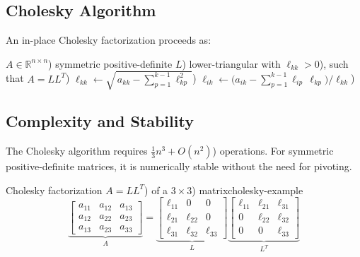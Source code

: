 \subsection{Cholesky Algorithm}
An in-place Cholesky factorization proceeds as:
\begin{algorithm}[H]
    \caption{Cholesky Decomposition}
    \label{alg:cholesky}
    \begin{algorithmic}[1]
        \Require \(A\in\mathbb{R}^{n\times n}\)) symmetric positive-definite
        \Ensure \(L\)) lower-triangular with \(\ell_{kk}>0\)), such that \(A = LL^T\))
        \State \(\ell_{kk} \gets \sqrt{\,a_{kk} - \sum_{p=1}^{k-1} \ell_{kp}^2\,}\))
        \State \(\ell_{ik} \gets \bigl(a_{ik} - \sum_{p=1}^{k-1} \ell_{ip}\,\ell_{kp}\bigr) / \ell_{kk}\))
        \EndFor
        \EndFor
    \end{algorithmic}
\end{algorithm}

\subsection{Complexity and Stability}
The Cholesky algorithm requires \(\tfrac{1}{3}n^3 + O(n^2)\)) operations. For symmetric positive-definite matrices, it is numerically stable without the need for pivoting.

\begin{example}{Cholesky factorization \(A=LL^T\)) of a \(3\times3\)) matrix}{cholesky-example}
    \begin{equation*}
        \underbrace{
            \begin{bmatrix}
                a_{11} & a_{12} & a_{13} \\
                a_{12} & a_{22} & a_{23} \\
                a_{13} & a_{23} & a_{33}
            \end{bmatrix}
        }_{A}
        =
        \underbrace{
            \begin{bmatrix}
                \ell_{11} & 0         & 0         \\
                \ell_{21} & \ell_{22} & 0         \\
                \ell_{31} & \ell_{32} & \ell_{33}
            \end{bmatrix}
        }_{L}
        \underbrace{
            \begin{bmatrix}
                \ell_{11} & \ell_{21} & \ell_{31} \\
                0         & \ell_{22} & \ell_{32} \\
                0         & 0         & \ell_{33}
            \end{bmatrix}
        }_{L^T}
    \end{equation*}
\end{example}

